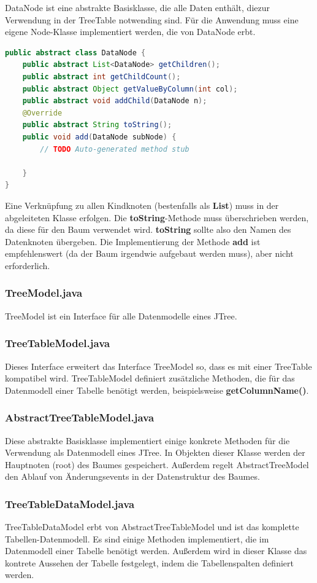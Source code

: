 DataNode ist eine abstrakte Basisklasse, die alle Daten enthält, diezur Verwendung in der TreeTable notwending sind. Für die Anwendung muss eine eigene Node-Klasse implementiert werden, die von DataNode erbt.

\begin{lstlisting}[language=JAVA]
public abstract class DataNode {
	public abstract List<DataNode> getChildren();
	public abstract int getChildCount();
	public abstract Object getValueByColumn(int col);
	public abstract void addChild(DataNode n);
	@Override
	public abstract String toString();
	public void add(DataNode subNode) {
		// TODO Auto-generated method stub
		
	}
}
\end{lstlisting}

Eine Verknüpfung zu allen Kindknoten (bestenfalls als \textbf{List}) muss in der abgeleiteten Klasse erfolgen. Die \textbf{toString}-Methode muss überschrieben werden, da diese für den Baum verwendet wird. \textbf{toString} sollte also den Namen des Datenknoten übergeben. Die Implementierung der Methode \textbf{add} ist empfehlenswert (da der Baum irgendwie aufgebaut werden muss), aber nicht erforderlich.

\subsubsection*{TreeModel.java}
TreeModel ist ein Interface für alle Datenmodelle eines JTree.

\subsubsection*{TreeTableModel.java}
Dieses Interface erweitert das Interface TreeModel so, dass es mit einer TreeTable kompatibel wird. TreeTableModel definiert zusätzliche Methoden, die für das Datenmodell einer Tabelle benötigt werden, beispielsweise \textbf{getColumnName()}.

\subsubsection*{AbstractTreeTableModel.java}
Diese abstrakte Basisklasse implementiert einige konkrete Methoden für die Verwendung als Datenmodell eines JTree. In Objekten dieser Klasse werden der Hauptnoten (root) des Baumes gespeichert. Außerdem regelt AbstractTreeModel den Ablauf von Änderungsevents in der Datenstruktur des Baumes.

\subsubsection*{TreeTableDataModel.java}
TreeTableDataModel erbt von AbstractTreeTableModel und ist das komplette Tabellen-Datenmodell. Es sind einige Methoden implementiert, die im Datenmodell einer Tabelle benötigt werden. Außerdem wird in dieser Klasse das kontrete Aussehen der Tabelle festgelegt, indem die Tabellenspalten definiert werden.

